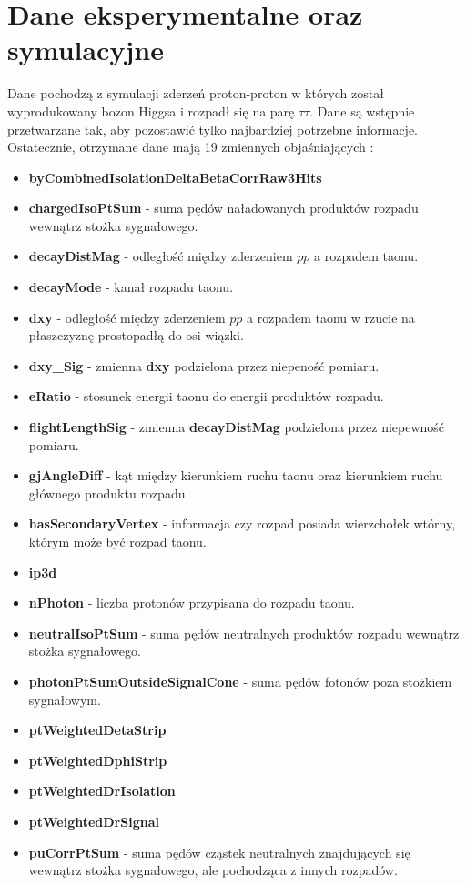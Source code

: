 \documentclass{pracalicmgr}
\begin{document}
    \chapter{Dane eksperymentalne oraz symulacyjne}
    \label{ch:dane}
    Dane pochodzą z symulacji zderzeń proton-proton w których został wyprodukowany bozon Higgsa i rozpadł się na parę $\tau\tau$.
Dane są wstępnie przetwarzane tak, aby pozostawić tylko najbardziej potrzebne informacje. Ostatecznie, otrzymane dane mają 19 zmiennych objaśniających \cite{cms2016reconstruction}:
	\begin{itemize}
	\item \textbf{byCombinedIsolationDeltaBetaCorrRaw3Hits} %
	\item \textbf{chargedIsoPtSum} - suma pędów naładowanych produktów rozpadu wewnątrz stożka sygnałowego.
	\item \textbf{decayDistMag} - odległość między zderzeniem $pp$ a rozpadem taonu.
	\item \textbf{decayMode} - kanał rozpadu taonu.
	\item \textbf{dxy} - odległość między zderzeniem $pp$ a rozpadem taonu w rzucie na płaszczyznę prostopadłą do osi wiązki.
	\item \textbf{dxy\_Sig} - zmienna \textbf{dxy} podzielona przez niepeność pomiaru.
	\item \textbf{eRatio} - stosunek energii taonu do energii produktów rozpadu.
	\item \textbf{flightLengthSig} - zmienna \textbf{decayDistMag} podzielona przez niepewność pomiaru. 
	\item \textbf{gjAngleDiff} - kąt między kierunkiem ruchu taonu oraz kierunkiem ruchu głównego produktu rozpadu.
	\item \textbf{hasSecondaryVertex} - informacja czy rozpad posiada wierzchołek wtórny, którym może być rozpad taonu.
	\item \textbf{ip3d} %
	\item \textbf{nPhoton} - liczba protonów przypisana do rozpadu taonu.
	\item \textbf{neutralIsoPtSum} - suma pędów neutralnych produktów rozpadu wewnątrz stożka sygnałowego.
	\item \textbf{photonPtSumOutsideSignalCone} - suma pędów fotonów poza stożkiem sygnałowym.
	\item \textbf{ptWeightedDetaStrip} %
	\item \textbf{ptWeightedDphiStrip} %
	\item \textbf{ptWeightedDrIsolation} %
	\item \textbf{ptWeightedDrSignal} %
	\item \textbf{puCorrPtSum} - suma pędów cząstek neutralnych znajdujących się wewnątrz stożka sygnałowego, ale pochodząca z innych rozpadów.
	\end{itemize}
	
\end{document}
